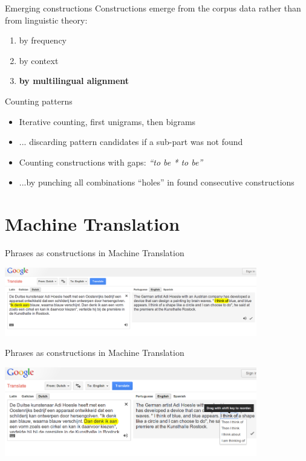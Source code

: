 \documentclass[compress]{beamer}
\begin{document}
\begin{frame}{Emerging constructions}
	Constructions emerge from the corpus data rather than from linguistic theory:
	\begin{enumerate}
		\item by frequency
		\item by context
		\item \textbf{by multilingual alignment}
	\end{enumerate}
\end{frame}


\begin{frame}{Counting patterns}
	\begin{itemize}
		\item Iterative counting, first unigrams, then bigrams
		\item  ... discarding pattern candidates if a sub-part was not found
		\item Counting constructions with gaps: \emph{``to be * to be''}
		\item ...by punching all combinations ``holes'' in found consecutive constructions
	\end{itemize}
\end{frame}

\section{Machine Translation}

\begin{frame}{Phrases as constructions in Machine Translation}
	\begin{center}
		 \includegraphics[width=110.0mm]{google1.png} 
	\end{center}
\end{frame}

\begin{frame}{Phrases as constructions in Machine Translation}
	\begin{center}
		 \includegraphics[width=110.0mm]{google2.png} 
	\end{center}
\end{frame}
\end{document}
